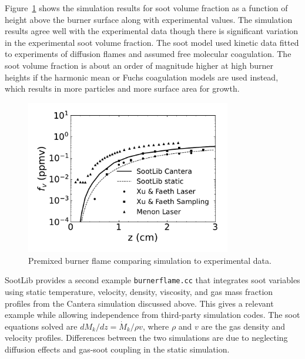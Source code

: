 \documentclass[preprint,letterpaper]{elsarticle}
\begin{document}
Figure~\ref{f:soot-premix} shows the simulation results for soot volume fraction as a function of height above the burner surface along with experimental values. 
The simulation results agree well with the experimental data though there is significant variation in the experimental soot volume fraction. The soot model used kinetic data fitted to experiments of diffusion flames and assumed free molecular coagulation. The soot volume fraction is about an order of magnitude higher at high burner heights if the harmonic mean or Fuchs coagulation models are used instead, which results in more particles and more surface area for growth.
%
\begin{figure}
    \begin{center}
        \includegraphics[width=0.8\textwidth]{fig_burner.pdf}
    \end{center}
    \caption{Premixed burner flame comparing simulation to experimental data.}
    \label{f:soot-premix}
\end{figure}
%

SootLib provides a second example \texttt{burner\textunderscore flame.cc} that integrates soot variables using static temperature, velocity, density, viscosity, and gas mass fraction profiles from the Cantera simulation discussed above. This gives a relevant example while allowing independence from third-party simulation codes. The soot equations solved are $dM_k/dz = \dot{M}_k/\rho v$, where $\rho$ and $v$ are the gas density and velocity profiles. Differences between the two simulations are due to neglecting diffusion effects and gas-soot coupling in the static simulation.
\end{document}

